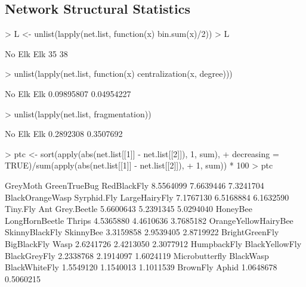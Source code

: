 \documentclass[11pt]{amsart}
\begin{document}
\subsection*{Network Structural Statistics}
\begin{Schunk}
\begin{Sinput}
> L <- unlist(lapply(net.list, function(x) bin.sum(x)/2))
> L
\end{Sinput}
\begin{Soutput}
No Elk    Elk 
    35     38 
\end{Soutput}
\begin{Sinput}
> unlist(lapply(net.list, function(x) centralization(x, degree)))
\end{Sinput}
\begin{Soutput}
    No Elk        Elk 
0.09895807 0.04954227 
\end{Soutput}
\begin{Sinput}
> unlist(lapply(net.list, fragmentation))
\end{Sinput}
\begin{Soutput}
   No Elk       Elk 
0.2892308 0.3507692 
\end{Soutput}
\begin{Sinput}
> ptc <- sort(apply(abs(net.list[[1]] - net.list[[2]]), 1, sum), 
+     decreasing = TRUE)/sum(apply(abs(net.list[[1]] - net.list[[2]]), 
+     1, sum)) * 100
> ptc
\end{Sinput}
\begin{Soutput}
            GreyMoth         GreenTrueBug          RedBlackFly 
           8.5564099            7.6639446            7.3241704 
     BlackOrangeWasp          Syrphid.Fly        LargeHairyFly 
           7.1767130            6.5168884            6.1632590 
            Tiny.Fly                  Ant          Grey.Beetle 
           5.6600643            5.2391345            5.0294040 
            HoneyBee       LongHornBeetle               Thrips 
           4.5365880            4.4610636            3.7685182 
OrangeYellowHairyBee       SkinnyBlackFly            SkinnyBee 
           3.3159858            2.9539405            2.8719922 
      BrightGreenFly          BigBlackFly                 Wasp 
           2.6241726            2.4213050            2.3077912 
         HumpbackFly       BlackYellowFly         BlackGreyFly 
           2.2338768            2.1914097            1.6024119 
      Microbutterfly            BlackWasp        BlackWhiteFly 
           1.5549120            1.1540013            1.1011539 
            BrownFly                Aphid 
           1.0648678            0.5060215 
\end{Soutput}
\end{Schunk}
\end{document}
